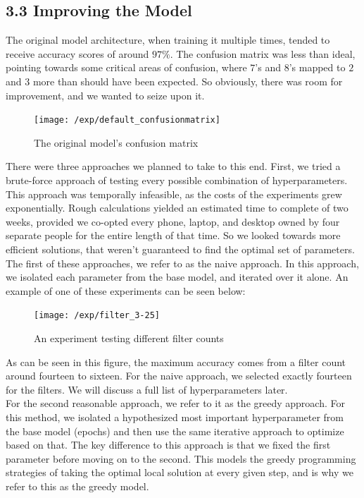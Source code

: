 \documentclass{article}
\begin{document}
\subsection*{3.3 Improving the Model}
The original model architecture, when training it multiple times, tended to receive accuracy scores of around $97\%$. The confusion matrix was less than ideal, pointing towards some critical areas of confusion, where $7$'s and $8$'s mapped to $2$ and $3$ more than should have been expected. So obviously, there was room for improvement, and we wanted to seize upon it.
\begin{figure}[H]
\texttt{[image: /exp/default\_confusionmatrix]}
\caption{The original model's confusion matrix}
\end{figure}

There were three approaches we planned to take to this end. First, we tried a brute-force approach of testing every possible combination of hyperparameters. This approach was temporally infeasible, as the costs of the experiments grew exponentially. Rough calculations yielded an estimated time to complete of two weeks, provided we co-opted every phone, laptop, and desktop owned by four separate people for the entire length of that time. So we looked towards more efficient solutions, that weren't guaranteed to find the optimal set of parameters.\\

The first of these approaches, we refer to as the naive approach. In this approach, we isolated each parameter from the base model, and iterated over it alone. An example of one of these experiments can be seen below:
\begin{figure}[H]
\texttt{[image: /exp/filter\_3-25]}
\caption{An experiment testing different filter counts}
\end{figure}
As can be seen in this figure, the maximum accuracy comes from a filter count around fourteen to sixteen. For the naive approach, we selected exactly fourteen for the filters. We will discuss a full list of hyperparameters later.\\

For the second reasonable approach, we refer to it as the greedy approach. For this method, we isolated a hypothesized most important hyperparameter from the base model (epochs) and then use the same iterative approach to optimize based on that. The key difference to this approach is that we fixed the first parameter before moving on to the second. This models the greedy programming strategies of taking the optimal local solution at every given step, and is why we refer to this as the greedy model.
\end{document}
